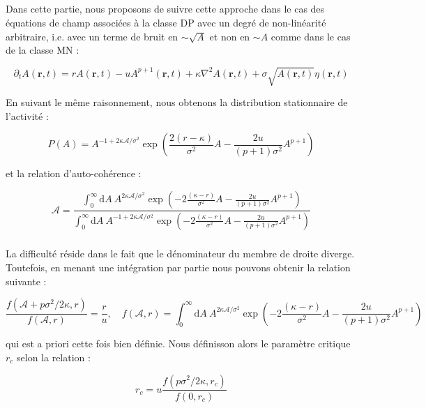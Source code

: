 \subparagraph{}Dans cette partie, nous proposons de suivre cette approche dans le cas des équations de champ associées à la classe DP avec un degré de non-linéarité arbitraire, i.e. avec un terme de bruit en $\sim \sqrt{A}$ et non en $\sim A$ comme dans le cas de la classe MN :

\begin{equation}
	\partial_t A(\mathbf{r}, t) = rA(\mathbf{r}, t) - uA^{p+1}(\mathbf{r}, t) + \kappa\nabla^2 A (\mathbf{r}, t) + \sigma \sqrt{A(\mathbf{r}, t)} \eta(\mathbf{r}, t)
	\label{eq:eqDParb}
\end{equation}

\noindent En suivant le même raisonnement, nous obtenons la distribution stationnaire de l'activité :

\begin{equation}
    P(A)=A^{-1+2\kappa\mathcal{A}/\sigma^2}\exp\left( \frac{2(r-\kappa)}{\sigma^2}A-\frac{2u}{(p+1)\sigma^2}A^{p+1} \right)
\end{equation}

\noindent et la relation d'auto-cohérence :

\begin{equation}
    \mathcal{A} = \frac{\int_ 0^\infty \mathrm{d}A~A^{2\kappa\mathcal{A}/\sigma^2}\exp\left( -2\frac{(\kappa-r)}{\sigma^2} A - \frac{2u}{(p+1)\sigma^2}A^{p+1} \right)}{\int_ 0^\infty \mathrm{d}A~A^{-1+2\kappa\mathcal{A}/\sigma^2}\exp\left( -2\frac{(\kappa-r)}{\sigma^2} A - \frac{2u}{(p+1)\sigma^2}A^{p+1} \right)}
\end{equation}

\subparagraph{}La difficulté réside dans le fait que le dénominateur du membre de droite diverge. Toutefois, en menant une intégration par partie nous pouvons obtenir la relation suivante :

\begin{equation}
    \frac{f\left( \mathcal{A} + p\sigma^2/2\kappa, r \right)}{f\left(\mathcal{A}, r\right)}=\frac{r}{u},\quad f(\mathcal{A}, r) = \int_ 0^\infty \mathrm{d}A~A^{2\kappa\mathcal{A}/\sigma^2}\exp\left( -2\frac{(\kappa-r)}{\sigma^2} A - \frac{2u}{(p+1)\sigma^2}A^{p+1} \right)
    \label{eq:selfconsistencyDP}
\end{equation}

\noindent qui est a priori cette fois bien définie. Nous définisson alors le paramètre critique $r_c$ selon la relation :

\begin{equation}
    r_c = u\frac{f\left(p\sigma^2/2\kappa, r_c \right)}{f\left(0, r_c\right)}
\end{equation}

